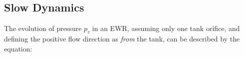 %
%	
%	
%
%
%	
%

\subsection{Slow Dynamics}\label{subsec:SlowDynamics}

The evolution of pressure $p_\tau$ in an EWR, assuming only one tank orifice, and defining the positive flow direction as \textit{from} the tank, can be described \cite{Jensen,Suresh2009} by the equation:

